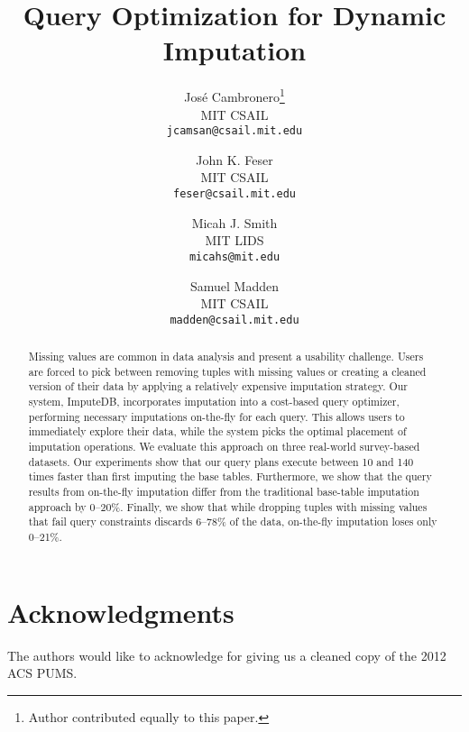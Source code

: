 \documentclass{vldb}
\title{Query Optimization for Dynamic Imputation}
\author{
  Jos\'e Cambronero\thanks{Author contributed equally to this paper.} \\
  MIT CSAIL \\
  \texttt{jcamsan@csail.mit.edu}
  \and
  John K. Feser\footnotemark[1] \\
  MIT CSAIL \\
  \texttt{feser@csail.mit.edu}
  \and
  Micah J. Smith\footnotemark[1] \\
  MIT LIDS \\
  \texttt{micahs@mit.edu}
  \and
  Samuel Madden \\
  MIT CSAIL \\
  \texttt{madden@csail.mit.edu}}
\newcommand{\ProjectName}{ImputeDB\xspace}
\newcommand{\lowxalphazero}{10} %
\newcommand{\highxalphazero}{140} %
\newcommand{\lowsmapealphazero}{0} %
\newcommand{\highsmapealphaone}{20} %
\begin{document}
\maketitle

\begin{abstract}
  Missing values are common in data analysis and present a usability challenge.
  Users are forced to pick between removing tuples with missing values or creating a cleaned version of their data by applying a relatively expensive imputation strategy.
  Our system, \ProjectName{}, incorporates imputation into a cost-based query optimizer, performing necessary imputations on-the-fly for each query.
  This allows users to immediately explore their data, while the system picks the optimal placement of imputation operations.
  We evaluate this approach on three real-world survey-based datasets.
  Our experiments show that our query plans execute between \lowxalphazero{} and \highxalphazero{} times faster than first imputing the base tables.
  Furthermore, we show that the query results from on-the-fly imputation differ from the
  traditional base-table imputation approach by \lowsmapealphazero{}--\highsmapealphaone{}\%.
  Finally, we show that while dropping tuples with missing values that fail query constraints discards 6--78\% of the data, on-the-fly imputation loses only 0--21\%.
\end{abstract}









\section{Acknowledgments}
The authors would like to acknowledge \citeauthor{akande2015empirical} for giving us a cleaned copy of the 2012 ACS PUMS.

\printbibliography
\balance
\end{document}
